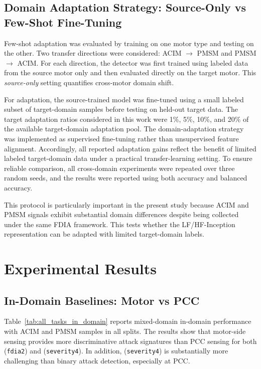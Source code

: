 \documentclass[lettersize,journal]{IEEEtran}
\begin{document}
\subsection{Domain Adaptation Strategy: Source-Only vs Few-Shot Fine-Tuning}
\label{sec:domain_adaptation}
Few-shot adaptation was evaluated by training on one motor type and testing on the other. Two transfer directions were considered: ACIM $\rightarrow$ PMSM and PMSM $\rightarrow$ ACIM. For each direction, the detector was first trained using labeled data from the source motor only and then evaluated directly on the target motor. This \emph{source-only} setting quantifies cross-motor domain shift.

For adaptation, the source-trained model was fine-tuned using a small labeled subset of target-domain samples before testing on held-out target data. The target adaptation ratios considered in this work were 1\%, 5\%, 10\%, and 20\% of the available target-domain adaptation pool.
The domain-adaptation strategy was implemented as supervised fine-tuning rather than unsupervised feature alignment. Accordingly, all reported adaptation gains reflect the benefit of limited labeled target-domain data under a practical transfer-learning setting. To ensure reliable comparison, all cross-domain experiments were repeated over three random seeds, and the results were reported using both accuracy and balanced accuracy.

This protocol is particularly important in the present study because ACIM and PMSM signals exhibit substantial domain differences despite being collected under the same FDIA framework. This tests whether the LF/HF-Inception representation can be adapted with limited target-domain labels.
\section{Experimental Results}
\label{sec:results}
\subsection{In-Domain Baselines: Motor vs PCC}
\label{sec:in_domain}

Table~\ref{tab:all_tasks_in_domain} reports mixed-domain in-domain performance with ACIM and PMSM samples in all splits. The results show that motor-side sensing provides more discriminative attack signatures than PCC sensing for both (\texttt{fdia2}) and (\texttt{severity4}). In addition, (\texttt{severity4}) is substantially more challenging than binary attack detection, especially at PCC.
\end{document}

